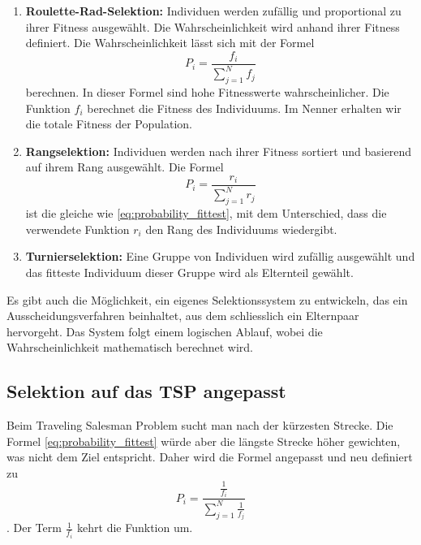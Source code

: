 \begin{enumerate}
    \item \textbf{Roulette-Rad-Selektion:} Individuen werden zufällig und
    proportional zu ihrer Fitness ausgewählt. Die Wahrscheinlichkeit wird 
    anhand ihrer Fitness definiert. Die Wahrscheinlichkeit lässt sich mit der Formel
    \begin{equation}
        P_i
        =
        \frac{f_i}{\sum_{j=1}^{N} f_j}
        \label{eq:probability_fittest}
    \end{equation}
    berechnen. In dieser Formel sind hohe Fitnesswerte wahrscheinlicher. Die Funktion \(f_i\) 
    berechnet die Fitness des Individuums. Im Nenner erhalten wir die totale Fitness der Population.
    \item \textbf{Rangselektion:} Individuen werden nach ihrer Fitness sortiert und basierend
    auf ihrem Rang ausgewählt. Die Formel 
    \begin{equation}
        P_i
        =
        \frac{r_i}{\sum_{j=1}^{N} r_j}
        \label{eq:probability_rating}
    \end{equation}
    ist die gleiche wie \eqref{eq:probability_fittest}, mit dem Unterschied, dass die verwendete Funktion 
    \(r_i\) den Rang des Individuums wiedergibt.
    \item \textbf{Turnierselektion:} Eine Gruppe von Individuen wird zufällig ausgewählt
    und das fitteste Individuum dieser Gruppe wird als Elternteil gewählt.
\end{enumerate}
Es gibt auch die Möglichkeit, ein eigenes Selektionssystem zu entwickeln, 
das ein Ausscheidungsverfahren beinhaltet, aus dem schliesslich ein 
Elternpaar hervorgeht. Das System folgt einem logischen Ablauf, wobei 
die Wahrscheinlichkeit mathematisch berechnet wird.

\subsection{Selektion auf das TSP angepasst
\label{buch:paper:varalg:subsection:selection_tsp}}
Beim Traveling Salesman Problem sucht man nach der kürzesten Strecke. Die Formel 
\eqref{eq:probability_fittest} würde aber die längste Strecke höher gewichten, was
nicht dem Ziel entspricht. Daher wird die Formel angepasst und neu definiert zu
\begin{equation}
    P_i
    =
    \frac{\frac{1}{f_i}}{\sum_{j=1}^{N} \frac{1}{f_j}}
    \label{eq:probability_fittest_tsp}
\end{equation}
. Der Term \(\frac{1}{f_i}\) kehrt die Funktion um.
